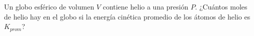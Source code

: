 \item Un globo esférico de volumen $V$ contiene helio a una presión $P$. ¿Cuántos moles de helio hay en el globo si la energía cinética promedio de los átomos de helio es $K_{prom}$?

